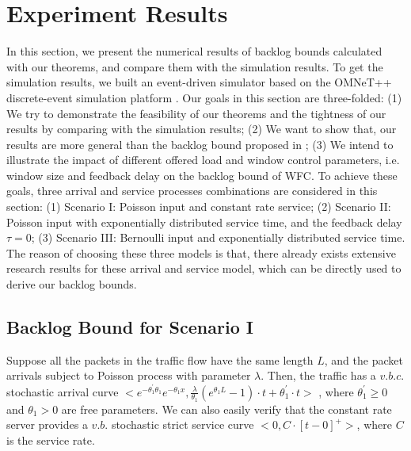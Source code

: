 \documentclass[paper]{ieice}
\begin{document}
\section{Experiment Results}\label{experiments}
In this section, we present the numerical results of backlog bounds calculated with our theorems, and compare them with the simulation results. To get the simulation results, we built an event-driven simulator based on the OMNeT++ discrete-event simulation platform \cite{omnetpp}. Our goals in this section are three-folded: (1) We try to demonstrate the feasibility of our theorems and the tightness of our results by comparing with the simulation results; (2) We want to show that, our results are more general than the backlog bound proposed in \cite{jung1996analysis}; (3) We intend to illustrate the impact of different offered load and window control parameters, i.e. window size and feedback delay on the backlog bound of WFC. To achieve these goals, three arrival and service processes combinations are considered in this section: (1) Scenario I: Poisson input and constant rate service; (2) Scenario II: Poisson input with exponentially distributed service time, and the feedback delay $\tau=0$; (3) Scenario III: Bernoulli input and exponentially distributed service time. The reason of choosing these three models is that, there already exists extensive research results for these arrival and service model, which can be directly used to derive our backlog bounds.

\subsection{Backlog Bound for Scenario I}
Suppose all the packets in the traffic flow have the same length $L$, and the packet arrivals subject to Poisson process with parameter $\lambda$. Then, the traffic has a $v.b.c.$ stochastic arrival curve $<e^{-\theta_1^\prime\theta_1}e^{-\theta_1 x},\frac{\lambda}{\theta_1}(e^{\theta_1 L}-1)\cdot t+\theta_1^\prime\cdot t>$ \cite{jiang2010note}, where $\theta_1^\prime\geq 0$ and $\theta_1>0$ are free parameters. We can also easily verify that the constant rate server provides a $v.b.$ stochastic strict service curve $<0,C\cdot [t-0]^+>$, where $C$ is the service rate.
\end{document}
